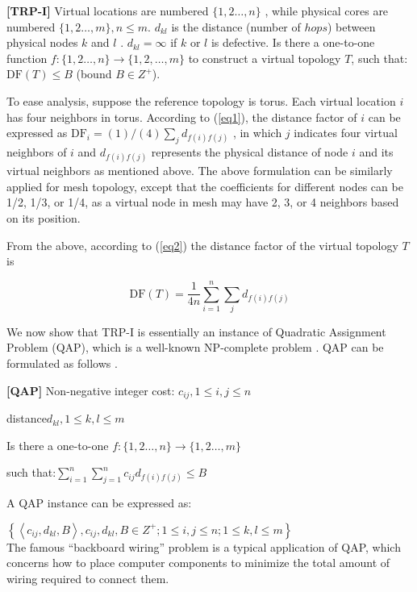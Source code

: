 \textbf{[TRP-I]} Virtual locations are numbered $\{1,2 \ldots, n\}$ , while physical cores are numbered $\{1,2 \ldots, m\}, n \leq m$. $d_{k l}$ is the distance (number of $hops$) between physical nodes $k$  and $l$ . $d_{k l}=\infty$ if $k$  or $l$ is defective. Is there a one-to-one function  $f:\{1,2 \ldots, n\} \rightarrow\{1,2, \ldots, m\}$ to construct a virtual topology $T$, such that:$\mathrm{DF}(T) \leq B$ (bound $B \in Z^{+}$).

To ease analysis, suppose the reference topology is torus. Each virtual location $i$ has four neighbors in torus. According to (\ref{eq1}), the distance factor of $i$ can be expressed as $\mathrm{DF}_{i}=(1) /(4) \sum_{j} d_{f(i) f(j)}$ , in which $j$ indicates four virtual neighbors of $i$  and $d_{f(i) f(j)}$    represents the physical distance of node $i$ and its virtual neighbors as mentioned above. The above formulation can be similarly applied for mesh topology, except that the coefficients for different nodes can be 1/2, 1/3, or 1/4, as a virtual node in mesh may have 2, 3, or 4 neighbors based on its position.

From the above, according to (\ref{eq2}) the distance factor of the virtual topology $T$ is

\begin{equation}
    \mathrm{DF}(T)=\frac{1}{4 n} \sum_{i=1}^{n} \sum_{j} d_{f(i) f(j)}
            \label{eq5}
\end{equation}

We now show that TRP-I is essentially an instance of Quadratic Assignment Problem (QAP), which is a well-known NP-complete problem \cite{sahni1976p}. QAP can be formulated as follows \cite{hartmanis1982computers}.

\textbf{[QAP]} Non-negative integer cost: $c_{i j}, 1\leq i, j \leq n$ \par
\textbf{\qquad\quad}distance$d_{k l}, 1 \leq k, l \leq m$ \par
\textbf{\qquad\quad}Is there  a one-to-one  $f:\{1,2 \ldots, n\} \rightarrow\{1,2 \ldots, m\}$  \par
\textbf{\qquad\quad}such that:$\sum_{i=1}^{n} \sum_{j=1}^{n} c_{i j} d_{f(i) f(j)} \leq B$

 A QAP instance can be expressed as: \par
 \textbf{\quad}$\left\{\left\langle c_{i j}, d_{k l}, B\right\rangle, c_{i j}, d_{k l}, B \in Z^{+} ; 1 \leq i, j \leq n ; 1 \leq k, l \leq m\right\}$ \\
The famous “backboard wiring” problem \cite{steinberg1961backboard} is a typical application of QAP, which concerns how to place computer components to minimize the total amount of wiring required to connect them.

